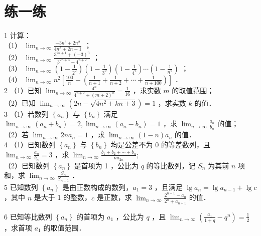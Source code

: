 \documentclass[10pt]{article}
\begin{document}
\section*{练一练}
1 计算：\\
（1） \(\lim _{n \rightarrow \infty} \frac{-3 n^{3}+2 n^{2}}{4 n^{3}+2 n-1}\) ；\\
（2） \(\lim _{n \rightarrow \infty} \frac{3^{2 n+1}+(-3)^{n}}{3^{2 n+3}-4^{n+2}}\) ；\\
（3） \(\lim _{n \rightarrow \infty}\left(1-\frac{1}{2^{2}}\right)\left(1-\frac{1}{3^{2}}\right)\left(1-\frac{1}{4^{2}}\right) \cdots\left(1-\frac{1}{n^{2}}\right)\) ；\\
（4） \(\lim _{n \rightarrow \infty} n^{2}\left[\frac{100}{n}-\left(\frac{1}{n+1}+\frac{1}{n+2}+\cdots+\frac{1}{n+100}\right)\right]\) ．\\
2 （1）已知 \(\lim _{n \rightarrow \infty} \frac{4^{n}}{4^{n+2}+(m+2)^{n}}=\frac{1}{16}\) ，求实数 \(m\) 的取值范围；\\
（2）已知 \(\lim _{n \rightarrow \infty}\left(2 n-\sqrt{4 n^{2}+k n+3}\right)=1\) ，求实数 \(k\) 的值．\\
3 （1）若数列 \(\left\{a_{n}\right\}\) 与 \(\left\{b_{n}\right\}\) 满足 \(\lim _{n \rightarrow \infty}\left(a_{n}+b_{n}\right)=2, \lim _{n \rightarrow \infty}\left(a_{n}-b_{n}\right)=1\) ，求 \(\lim _{n \rightarrow \infty} \frac{a_{n}}{b_{n}}\) 的值；\\
（2）若 \(\lim _{n \rightarrow \infty} 2 n a_{n}=1\) ，求 \(\lim _{n \rightarrow \infty}(1-n) a_{n}\) 的值．\\
4 （1）已知数列 \(\left\{a_{n}\right\}\) 与 \(\left\{b_{n}\right\}\) 均是公差不为 0 的等差数列，且 \(\lim _{n \rightarrow \infty} \frac{a_{n}}{b_{n}}=3\) ，求 \(\lim _{n \rightarrow \infty} \frac{b_{1}+b_{2}+\cdots+b_{n}}{n a_{2 n}} ;\)\\
（2）已知数列 \(\left\{a_{n}\right\}\) 是首项为 1 ，公比为 \(q\) 的等比数列，记 \(S_{n}\) 为其前 \(n\) 项和，求 \(\lim _{n \rightarrow \infty} \frac{S_{n}}{S_{n+1}}\) ．\\
5 已知数列 \(\left\{a_{n}\right\}\) 是由正数构成的数列，\(a_{1}=3\) ，且满足 \(\lg a_{n}=\lg a_{n-1}+\lg c\) ，其中 \(n\) 是大于 1 的整数，\(c\) 是正数，求 \(\lim _{n \rightarrow \infty} \frac{2^{n-1}-a_{n}}{2^{n}+a_{n+1}}\) 的值．

6 已知等比数列 \(\left\{a_{n}\right\}\) 的首项为 \(a_{1}\) ，公比为 \(q\) ，且 \(\lim _{n \rightarrow \infty}\left(\frac{a_{1}}{1+q}-q^{n}\right)=\frac{1}{2}\) ，求首项 \(a_{1}\) 的取值范围．
\end{document}
